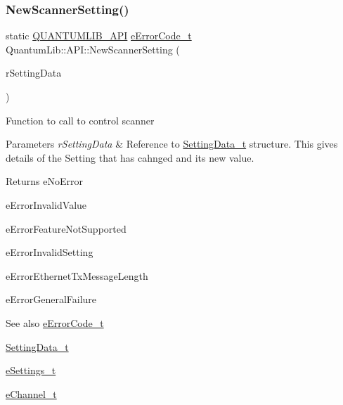 \subsubsection{\texorpdfstring{New\+Scanner\+Setting()}{NewScannerSetting()}}
{\footnotesize\ttfamily static \mbox{\hyperlink{_quantum_lib_8h_ad3e98d692c0cc10807f05b7d009ebadb}{Q\+U\+A\+N\+T\+U\+M\+L\+I\+B\+\_\+\+A\+PI}} \mbox{\hyperlink{namespace_quantum_lib_ae3625bf7f9a1ca0d93adb9a2e0194d47}{e\+Error\+Code\+\_\+t}} Quantum\+Lib\+::\+A\+P\+I\+::\+New\+Scanner\+Setting (\begin{DoxyParamCaption}\item[{\mbox{\hyperlink{struct_quantum_lib_1_1_setting_data__t}{Setting\+Data\+\_\+t}} \&}]{r\+Setting\+Data }\end{DoxyParamCaption})\hspace{0.3cm}{\ttfamily [static]}}

Function to call to control scanner 
\begin{DoxyParams}{Parameters}
{\em r\+Setting\+Data} & Reference to \mbox{\hyperlink{struct_quantum_lib_1_1_setting_data__t}{Setting\+Data\+\_\+t}} structure. This gives details of the Setting that has cahnged and its new value. \\
\hline
\end{DoxyParams}
\begin{DoxyReturn}{Returns}
e\+No\+Error 

e\+Error\+Invalid\+Value 

e\+Error\+Feature\+Not\+Supported 

e\+Error\+Invalid\+Setting 

e\+Error\+Ethernet\+Tx\+Message\+Length 

e\+Error\+General\+Failure 
\end{DoxyReturn}
\begin{DoxySeeAlso}{See also}
\mbox{\hyperlink{namespace_quantum_lib_ae3625bf7f9a1ca0d93adb9a2e0194d47}{e\+Error\+Code\+\_\+t}} 

\mbox{\hyperlink{struct_quantum_lib_1_1_setting_data__t}{Setting\+Data\+\_\+t}} 

\mbox{\hyperlink{namespace_quantum_lib_acc8124e3e65bca4aa798d03a55e3d54c}{e\+Settings\+\_\+t}} 

\mbox{\hyperlink{namespace_quantum_lib_ad62fc36ad3cd7ee810cbfc545d04ea9c}{e\+Channel\+\_\+t}} 
\end{DoxySeeAlso}
\mbox{\label{class_quantum_lib_1_1_a_p_i_a6be3553bb420e8f804d1ea652273cc99}} 
